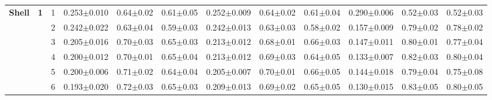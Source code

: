 \begin{table*}
{\begin{tabular}{|l|c|c||c|c|c||c|c|c||c|c|c|}
\hline\hline
\multirow{12}{*}{\textbf{Shell}} & \multirow{8}{*}{\textbf{1}} & 1 & \textcolor{gate_color}{0.253$\pm$0.010} & \textcolor{gate_color}{0.64$\pm$0.02} & \textcolor{gate_color}{0.61$\pm$0.05} & \textcolor{mixed_color}{0.252$\pm$0.009} & \textcolor{mixed_color}{0.64$\pm$0.02} & \textcolor{mixed_color}{0.61$\pm$0.04} & \textcolor{pulsed_color}{0.290$\pm$0.006} & \textcolor{pulsed_color}{0.52$\pm$0.03} & \textcolor{pulsed_color}{0.52$\pm$0.03} \\
 & & 2 & \textcolor{gate_color}{0.242$\pm$0.022} & \textcolor{gate_color}{0.63$\pm$0.04} & \textcolor{gate_color}{0.59$\pm$0.03} & \textcolor{mixed_color}{0.242$\pm$0.013} & \textcolor{mixed_color}{0.63$\pm$0.03} & \textcolor{mixed_color}{0.58$\pm$0.02} & \textcolor{pulsed_color}{0.157$\pm$0.009} & \textcolor{pulsed_color}{0.79$\pm$0.02} & \textcolor{pulsed_color}{0.78$\pm$0.02} \\
 & & 3 & \textcolor{gate_color}{0.205$\pm$0.016} & \textcolor{gate_color}{0.70$\pm$0.03} & \textcolor{gate_color}{0.65$\pm$0.03} & \textcolor{mixed_color}{0.213$\pm$0.012} & \textcolor{mixed_color}{0.68$\pm$0.01} & \textcolor{mixed_color}{0.66$\pm$0.03} & \textcolor{pulsed_color}{0.147$\pm$0.011} & \textcolor{pulsed_color}{0.80$\pm$0.01} & \textcolor{pulsed_color}{0.77$\pm$0.04} \\
 & & 4 & \textcolor{gate_color}{0.200$\pm$0.012} & \textcolor{gate_color}{0.70$\pm$0.01} & \textcolor{gate_color}{0.65$\pm$0.04} & \textcolor{mixed_color}{0.213$\pm$0.012} & \textcolor{mixed_color}{0.69$\pm$0.03} & \textcolor{mixed_color}{0.64$\pm$0.05} & \textcolor{pulsed_color}{0.133$\pm$0.007} & \textcolor{pulsed_color}{0.82$\pm$0.03} & \textcolor{pulsed_color}{0.80$\pm$0.04} \\
 & & 5 & \textcolor{gate_color}{0.200$\pm$0.006} & \textcolor{gate_color}{0.71$\pm$0.02} & \textcolor{gate_color}{0.64$\pm$0.04} & \textcolor{mixed_color}{0.205$\pm$0.007} & \textcolor{mixed_color}{0.70$\pm$0.01} & \textcolor{mixed_color}{0.66$\pm$0.05} & \textcolor{pulsed_color}{0.144$\pm$0.018} & \textcolor{pulsed_color}{0.79$\pm$0.04} & \textcolor{pulsed_color}{0.75$\pm$0.08} \\
 & & 6 & \textcolor{gate_color}{0.193$\pm$0.020} & \textcolor{gate_color}{0.72$\pm$0.03} & \textcolor{gate_color}{0.65$\pm$0.03} & \textcolor{mixed_color}{0.209$\pm$0.013} & \textcolor{mixed_color}{0.69$\pm$0.02} & \textcolor{mixed_color}{0.65$\pm$0.05} & \textcolor{pulsed_color}{0.130$\pm$0.015} & \textcolor{pulsed_color}{0.83$\pm$0.05} & \textcolor{pulsed_color}{0.80$\pm$0.05} \\

\end{tabular}}
\end{table*}
